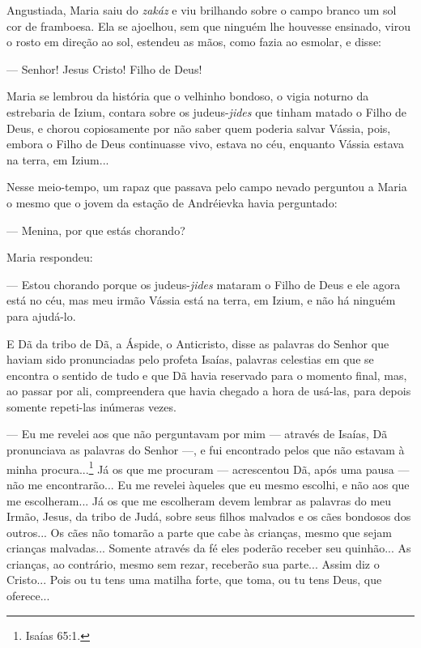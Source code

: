 Angustiada, Maria saiu do \emph{zakáz} e viu brilhando sobre o campo
branco um sol cor de framboesa. Ela se ajoelhou, sem que ninguém lhe
houvesse ensinado, virou o rosto em direção ao sol, estendeu as mãos,
como fazia ao esmolar, e disse:

--- Senhor! Jesus Cristo! Filho de Deus!

Maria se lembrou da história que o velhinho bondoso, o vigia noturno da
estrebaria de Izium, contara sobre os judeus-\emph{jides} que tinham
matado o Filho de Deus, e chorou copiosamente por não saber quem poderia
salvar Vássia, pois, embora o Filho de Deus continuasse vivo, estava no
céu, enquanto Vássia estava na terra, em Izium...

Nesse meio-tempo, um rapaz que passava pelo campo nevado perguntou a
Maria o mesmo que o jovem da estação de Andréievka havia perguntado:

--- Menina, por que estás chorando?

Maria respondeu:

--- Estou chorando porque os judeus-\emph{jides} mataram o Filho de Deus
e ele agora está no céu, mas meu irmão Vássia está na terra, em Izium, e
não há ninguém para ajudá-lo.

E Dã da tribo de Dã, a Áspide, o Anticristo, disse as palavras do Senhor
que haviam sido pronunciadas pelo profeta Isaías, palavras celestias em
que se encontra o sentido de tudo e que Dã havia reservado para o
momento final, mas, ao passar por ali, compreendera que havia chegado a
hora de usá-las, para depois somente repeti-las inúmeras vezes.

--- Eu me revelei aos que não perguntavam por mim --- através de Isaías,
Dã pronunciava as palavras do Senhor ---, e fui encontrado pelos que não
estavam à minha procura...\footnote{Isaías 65:1.} Já os que me procuram
--- acrescentou Dã, após uma pausa --- não me encontrarão... Eu me
revelei àqueles que eu mesmo escolhi, e não aos que me escolheram... Já
os que me escolheram devem lembrar as palavras do meu Irmão, Jesus, da
tribo de Judá, sobre seus filhos malvados e os cães bondosos dos
outros... Os cães não tomarão a parte que cabe às crianças, mesmo que
sejam crianças malvadas... Somente através da fé eles poderão receber
seu quinhão... As crianças, ao contrário, mesmo sem rezar, receberão sua
parte... Assim diz o Cristo... Pois ou tu tens uma matilha forte, que
toma, ou tu tens Deus, que oferece...

